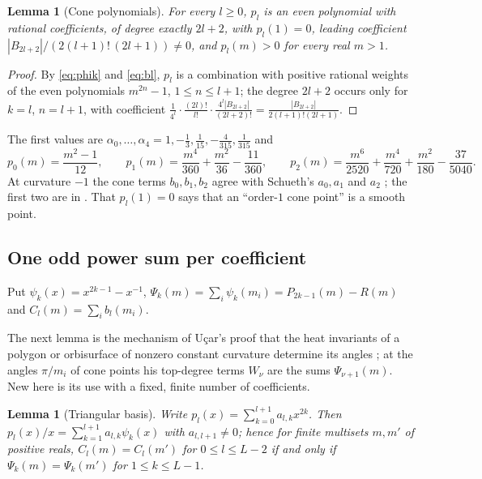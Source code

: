 \documentclass[pdflatex,sn-mathphys-num]{sn-jnl}
\theoremstyle{thmstyleone}%
\newtheorem{lemma}[theorem]{Lemma}%
\theoremstyle{thmstylethree}%
\begin{document}
\begin{lemma}[Cone polynomials]\label{lem:conepoly}
For every $l\ge0$, $p_l$ is an even polynomial with rational coefficients, of degree exactly $2l+2$, with $p_l(1)=0$, leading coefficient $|B_{2l+2}|/(2(l+1)!\,(2l+1))\ne0$, and $p_l(m)>0$ for every real $m>1$.
\end{lemma}

\begin{proof}
By \eqref{eq:phik} and \eqref{eq:bl}, $p_l$ is a combination with positive rational weights of the even polynomials $m^{2n}-1$, $1\le n\le l+1$; the degree $2l+2$ occurs only for $k=l$, $n=l+1$, with coefficient $\frac1{4^l}\cdot\frac{(2l)!}{l!}\cdot\frac{4^{l}|B_{2l+2}|}{(2l+2)!}=\frac{|B_{2l+2}|}{2(l+1)!(2l+1)}$.
\end{proof}

The first values are $\alpha_0,\dots,\alpha_4=1,-\frac13,\frac1{15},-\frac4{315},\frac1{315}$ and
\begin{equation}\label{eq:plexplicit}
  p_0(m)=\frac{m^2-1}{12},\qquad p_1(m)=\frac{m^4}{360}+\frac{m^2}{36}-\frac{11}{360},\qquad p_2(m)=\frac{m^6}{2520}+\frac{m^4}{720}+\frac{m^2}{180}-\frac{37}{5040}.
\end{equation}
At curvature $-1$ the cone terms $b_0,b_1,b_2$ agree with Schueth's $a_0,a_1$ \cite[Rem.~4.2]{schueth2019} and $a_2$ \cite[Thm~4.1]{schueth2019}; the first two are in \cite[Ex.~5.6]{dggw2008}. That $p_l(1)=0$ says that an ``order-$1$ cone point'' is a smooth point.


\subsection{One odd power sum per coefficient}\label{sec:basis}

Put $\psi_k(x)=x^{2k-1}-x^{-1}$, $\Psi_k(m)=\sum_i\psi_k(m_i)=P_{2k-1}(m)-R(m)$ and $C_l(m)=\sum_ib_l(m_i)$.

The next lemma is the mechanism of U\c{c}ar's proof that the heat invariants of a polygon or orbisurface of nonzero constant curvature determine its angles \cite[Thm~3.40 and its proof, pp.~98--99]{ucar2017}; at the angles $\pi/m_i$ of cone points his top-degree terms $W_\nu$ are the sums $\Psi_{\nu+1}(m)$. New here is its use with a fixed, finite number of coefficients.

\begin{lemma}[Triangular basis]\label{lem:triangular}
Write $p_l(x)=\sum_{k=0}^{l+1}a_{l,k}x^{2k}$. Then $p_l(x)/x=\sum_{k=1}^{l+1}a_{l,k}\psi_k(x)$ with $a_{l,l+1}\ne0$; hence for finite multisets $m,m'$ of positive reals, $C_l(m)=C_l(m')$ for $0\le l\le L-2$ if and only if $\Psi_k(m)=\Psi_k(m')$ for $1\le k\le L-1$.
\end{lemma}
\end{document}

